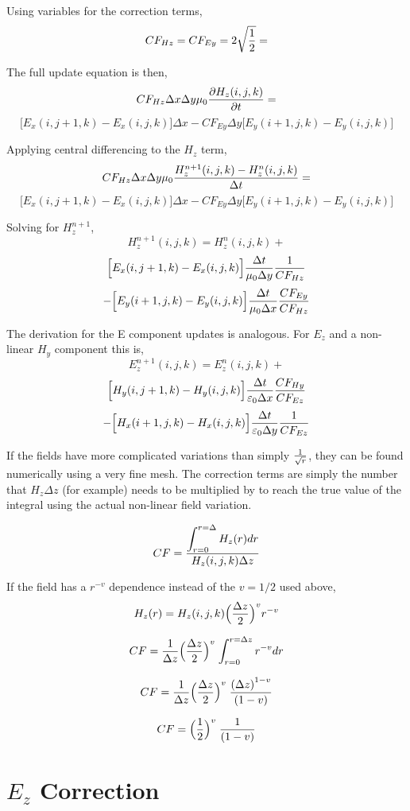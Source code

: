\documentclass{article}
\begin{document}
Using variables for the correction terms,
\[CF_{Hz} = CF_{Ey} = 2  \sqrt{1\over 2} = \]


The full update equation is then,
\[CF_{Hz} \Delta x \Delta y \mu_0  { \partial H_z(i,j,k)  \over \partial t} = \]
\[\Big[E_x(i, j+1, k) - E_x(i, j, k)\Big] \Delta x -  CF_{Ey}{\Delta y}\Big[{ E_y(i+1,j,k) } - { E_y(i,j,k) }\Big] \]

Applying central differencing to the \(H_z\) term,
\[CF_{Hz} \Delta x \Delta y \mu_0  { H_z^{n+1}(i,j,k) -H_z^{n}(i,j,k)  \over  \Delta t}=\]
\[\Big[E_x(i, j+1, k) - E_x(i, j, k)\Big] \Delta x -  CF_{Ey}{\Delta y}\Big[{ E_y(i+1,j,k) } - { E_y(i,j,k) }\Big] \]

Solving for \(H_z^{n+1}\),
\[ H_z^{n+1}(i,j,k) =  H_z^{n}(i,j,k) + \]
\[ \Big[E_x(i, j+1, k) - E_x(i, j, k)\Big] { \Delta t\over \mu_0 \Delta y } {1 \over  CF_{Hz} }\]
\[ - \Big[{ E_y(i+1,j,k) } - { E_y(i,j,k) }\Big] {\Delta t\over \mu_0 \Delta x } {CF_{Ey} \over CF_{Hz} } \] 

The derivation for the E component updates is analogous. For \(E_z\) and a  non-linear \(H_y\) component this is,
\[ E_z^{n+1}(i,j,k) =  E_z^{n}(i,j,k) + \]
\[ \Big[H_y(i, j+1, k) - H_y(i, j, k)\Big] { \Delta t\over \varepsilon_0 \Delta x } {CF_{Hy}  \over  CF_{Ez} }\]
\[ - \Big[{ H_x(i+1,j,k) } - { H_x(i,j,k) }\Big] {\Delta t\over \varepsilon_0 \Delta y } {1\over CF_{Ez} } \] 

If the fields have more complicated variations than simply \(1 \over \sqrt{r}\), they can be found numerically using a very fine mesh. The correction terms are simply the number that \(H_z \Delta z\) (for example) needs to be multiplied by to reach the true value of the integral using the actual non-linear field variation.

\[ CF = {\displaystyle \int_{r=0}^{r=\Delta}  { H_z(r)}  dr \over  H_z(i,j,k) \Delta z}\]

If the field has a \(r^{-v}\) dependence instead of the \(v={1/2}\) used above,
\[H_z(r) = { H_z(i,j,k) } \Big({\Delta z \over 2}\Big)^{v} {r}^{-v} \]

\[ CF = {1 \over \Delta z} \Big({\Delta z \over 2}\Big)^{v} \; {\displaystyle \int_{r=0}^{r=\Delta z}   {r}^{-v}  dr }\]

\[ CF = {1 \over \Delta z} \Big({\Delta z \over 2}\Big)^{v} \; {  {(\Delta z)}^{1-v}  \over (1-v) }\]

\[ CF = \Big({1\over 2}\Big)^{v} \; {  1  \over (1-v) }\]

\section{\(E_z\) Correction}
\end{document}
